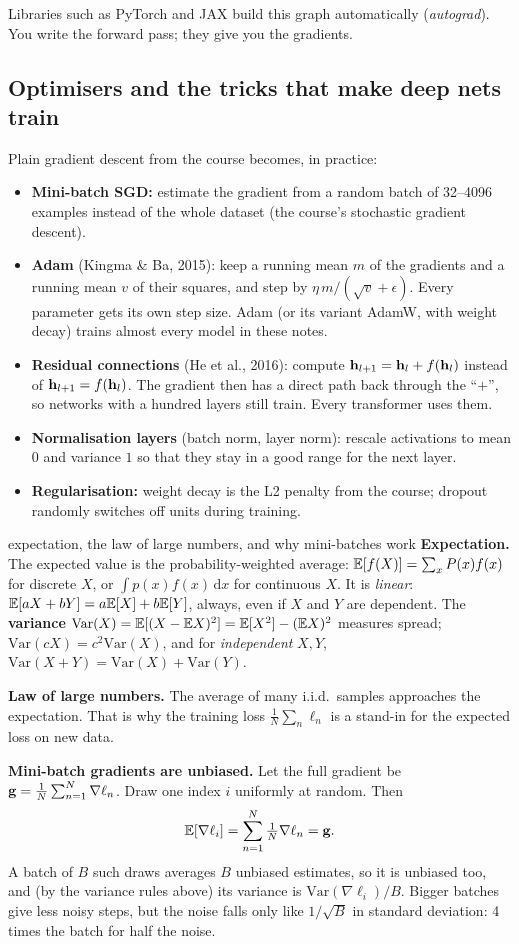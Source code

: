 Libraries such as PyTorch and JAX build this graph automatically (\emph{autograd}). You write the forward pass; they give you the gradients.

\subsection{Optimisers and the tricks that make deep nets train}
Plain gradient descent from the course becomes, in practice:
\begin{itemize}
\item \textbf{Mini-batch SGD:} estimate the gradient from a random batch of 32--4096 examples instead of the whole dataset (the course's stochastic gradient descent).
\item \textbf{Adam} (Kingma \& Ba, 2015): keep a running mean $m$ of the gradients and a running mean $v$ of their squares, and step by $\eta\, m/(\sqrt v+\epsilon)$. Every parameter gets its own step size. Adam (or its variant AdamW, with weight decay) trains almost every model in these notes.
\item \textbf{Residual connections} (He et al., 2016): compute $\mathbf{h}_{l+1}=\mathbf{h}_l+f(\mathbf{h}_l)$ instead of $\mathbf{h}_{l+1}=f(\mathbf{h}_l)$. The gradient then has a direct path back through the ``$+$'', so networks with a hundred layers still train. Every transformer uses them.
\item \textbf{Normalisation layers} (batch norm, layer norm): rescale activations to mean $0$ and variance $1$ so that they stay in a good range for the next layer.
\item \textbf{Regularisation:} weight decay is the L2 penalty from the course; dropout randomly switches off units during training.
\end{itemize}

\begin{probbox}{expectation, the law of large numbers, and why mini-batches work}
\textbf{Expectation.} The expected value is the probability-weighted average: $\mathbb{E}[f(X)]=\sum_x P(x)f(x)$ for discrete $X$, or $\int p(x)f(x)\,\mathrm dx$ for continuous $X$. It is \emph{linear}: $\mathbb{E}[aX+bY]=a\mathbb{E}[X]+b\mathbb{E}[Y]$, always, even if $X$ and $Y$ are dependent. The \textbf{variance} $\mathrm{Var}(X)=\mathbb{E}[(X-\mathbb{E} X)^2]=\mathbb{E}[X^2]-(\mathbb{E} X)^2$ measures spread; $\mathrm{Var}(cX)=c^2\mathrm{Var}(X)$, and for \emph{independent} $X,Y$, $\mathrm{Var}(X+Y)=\mathrm{Var}(X)+\mathrm{Var}(Y)$.

\textbf{Law of large numbers.} The average of many i.i.d.\ samples approaches the expectation. That is why the training loss $\frac1N\sum_n\ell_n$ is a stand-in for the expected loss on new data.

\textbf{Mini-batch gradients are unbiased.} Let the full gradient be $\mathbf{g}=\frac1N\sum_{n=1}^N\nabla\ell_n$. Draw one index $i$ uniformly at random. Then
\[
\mathbb{E}[\nabla\ell_i]=\sum_{n=1}^N\tfrac1N\nabla\ell_n=\mathbf{g} .
\]
A batch of $B$ such draws averages $B$ unbiased estimates, so it is unbiased too, and (by the variance rules above) its variance is $\mathrm{Var}(\nabla\ell_i)/B$. Bigger batches give less noisy steps, but the noise falls only like $1/\sqrt B$ in standard deviation: 4 times the batch for half the noise.
\end{probbox}

